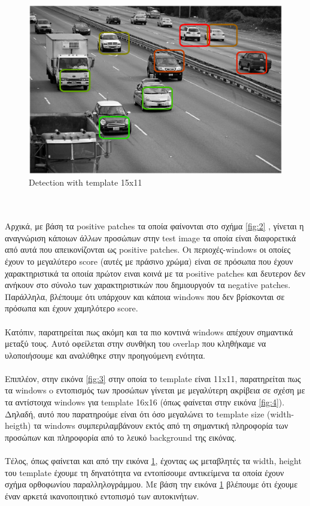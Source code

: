 \documentclass{article}
\newcommand{\tl}[1]{\textlatin{#1}}
\begin{document}
	\begin{figure}[H]
		\centering
		\includegraphics[scale=0.5]{res/car_15_11.eps}		
		\caption{\tl{Detection with template 15x11}}
		\label{fig:7}
	\end{figure}

	\ \\\\
	\noindent
	Aρχικά, με βάση τα \tl{positive patches} τα οποία φαίνονται στο σχήμα \ref{fig:2} , γίνεται η αναγνώριση κάποιων άλλων 
	προσώπων στην \tl{test image} τα οποία είναι διαφορετικά από αυτά που απεικονίζονται ως \tl{positive patches}. Oι περιοχές-\tl{windows} οι οποίες έχουν το μεγαλύτερο \tl{score} (αυτές με πράσινο χρώμα) είναι 
	σε πρόσωπα που έχουν χαρακτηριστικά τα οποιία πρώτον ειναι κοινά με τα \tl{positive patches} και δευτερον δεν ανήκουν στο σύνολο των χαρακτηριστικών που δημιουργούν τα \tl{negative patches}. Παράλληλα, βλέπουμε ότι υπάρχουν και κάποια \tl{windows} που δεν βρίσκονται σε πρόσωπα και έχουν χαμηλότερο \tl{score}.  
	\\\\ 
	\noindent 
	Κατόπιν, παρατηρείται πως ακόμη και τα πιο κοντινά \tl{windows} απέχουν σημαντικά μεταξύ τους. Αυτό οφείλεται στην συνθήκη του \tl{overlap}	που κληθήκαμε να υλοποιήσουμε και αναλύθηκε στην προηγούμενη ενότητα.
	\\\\
	\noindent
	Επιπλέον, στην εικόνα \ref{fig:3} στην οποία το \tl{template} είναι 11\tl{x}11, παρατηρείται πως τα \tl{windows} o εντοπισμός των προσώπων γίνεται με μεγαλύτερη ακρίβεια σε σχέση με τα αντίστοιχα \tl{windows} για \tl{template} 16\tl{x}16 (όπως φαίνεται στην εικόνα \ref{fig:4}). Δηλαδή, αυτό που παρατηρούμε είναι ότι όσο μεγαλώνει το \tl{template size (width-heigth)} τα \tl{windows} συμπεριλαμβάνουν εκτός από τη σημαντική πληροφορία των προσώπων και πληροφορία από το λευκό \tl{background} της εικόνας.
	\\\\
	\noindent
	Τέλος, όπως φαίνεται και από την εικόνα \ref{fig:7}, έχοντας ως μεταβλητές τα \tl{width}, \tl{height} του \tl{template} έχουμε τη δηνατότητα να εντοπίσουμε αντικείμενα τα οποία έχουν σχήμα ορθοφωνίου παραλληλογράμμου. Με βάση την εικόνα \ref{fig:7} βλέπουμε ότι έχουμε έναν αρκετά ικανοποιητικό εντοπισμό των αυτοκινήτων.
\end{document}
